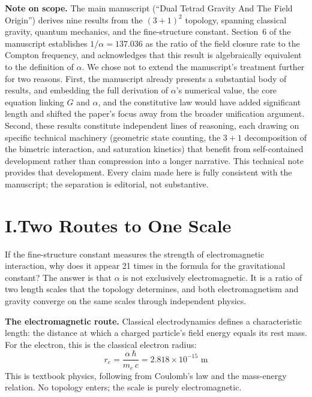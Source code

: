 \documentclass[11pt]{article}
\begin{document}
\textbf{Note on scope.}\quad
The main manuscript (``Dual Tetrad Gravity And The Field Origin'') derives nine results from the $(3+1)^2$ topology, spanning classical gravity, quantum mechanics, and the fine-structure constant.
Section~6 of the manuscript establishes $1/\alpha = 137.036$ as the ratio of the field closure rate to the Compton frequency, and acknowledges that this result is algebraically equivalent to the definition of $\alpha$.
We chose not to extend the manuscript's treatment further for two reasons.
First, the manuscript already presents a substantial body of results, and embedding the full derivation of $\alpha$'s numerical value, the core equation linking $G$ and $\alpha$, and the constitutive law would have added significant length and shifted the paper's focus away from the broader unification argument.
Second, these results constitute independent lines of reasoning, each drawing on specific technical machinery (geometric state counting, the $3+1$ decomposition of the bimetric interaction, and saturation kinetics) that benefit from self-contained development rather than compression into a longer narrative.
This technical note provides that development.
Every claim made here is fully consistent with the manuscript; the separation is editorial, not substantive.

\section*{I.\quad Two Routes to One Scale}

If the fine-structure constant measures the strength of electromagnetic interaction, why does it appear 21 times in the formula for the gravitational constant?
The answer is that $\alpha$ is not exclusively electromagnetic.
It is a ratio of two length scales that the topology determines, and both electromagnetism and gravity converge on the same scales through independent physics.

\textbf{The electromagnetic route.}\quad
Classical electrodynamics defines a characteristic length: the distance at which a charged particle's field energy equals its rest mass.
For the electron, this is the classical electron radius:
\begin{equation}
r_e = \frac{\alpha\,\hbar}{m_e\,c} = 2.818 \times 10^{-15}\text{ m}
\label{eq:re-em}
\end{equation}
This is textbook physics, following from Coulomb's law and the mass-energy relation.
No topology enters; the scale is purely electromagnetic.
\end{document}
